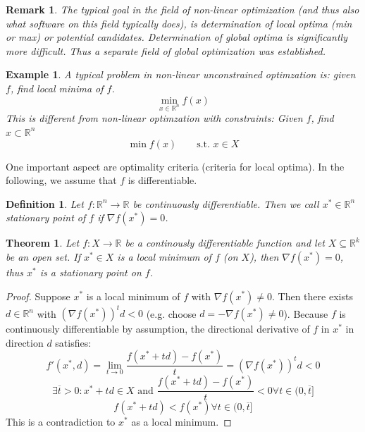 \documentclass[a4paper]{article}
\newcounter{lecref}[subsection]
\numberwithin{lecref}{subsection}
\newtheorem{theorem}[lecref]{Theorem}
\newtheorem*{Example}{Example}
\newtheorem{definition}[lecref]{Definition}
\newtheorem*{Remark}{Remark}
\begin{document}
\begin{Remark}
	The typical goal in the field of non-linear optimization (and thus also what software on this field typically does), is determination of local optima (min or max) or potential candidates. Determination of global optima is significantly more difficult. Thus a separate field of global optimization was established.
\end{Remark}

\begin{Example}
	A typical problem in non-linear unconstrained optimzation is: given $f$, find local minima of $f$.
	\[ \min_{x \in \mathbb R^n} f(x) \]
	This is different from non-linear optimzation \emph{with} constraints:
	Given $f$, find $x \subset \mathbb R^n$
	\[ \min f(x) \qquad \text{s.t. } x \in X \]
\end{Example}

One important aspect are optimality criteria (criteria for local optima).
In the following, we assume that $f$ is differentiable.

\begin{definition}
	Let $f: \mathbb R^n \to \mathbb R$ be continuously differentiable. Then we call $x^* \in \mathbb R^n$ \emph{stationary point} of $f$ if $\nabla f(x^*) = 0$.
\end{definition}

\begin{theorem}
	\label{theorem:2.1.1}
	Let $f: X \to \mathbb R$ be a continously differentiable function and let $X \subseteq \mathbb R^k$ be an open set. If $x^* \in X$ is a local minimum of $f$ (on $X$), then $\nabla f(x^*) = 0$, thus $x^*$ is a stationary point on $f$.
\end{theorem}

\begin{proof}
	Suppose $x^*$ is a local minimum of $f$ with $\nabla f(x^*) \neq 0$.
	Then there exists $d \in \mathbb R^n$ with $(\nabla f(x^*))^t d < 0$ (e.g. choose $d = -\nabla f(x^*) \neq 0$).
	Because $f$ is continuously differentiable by assumption, the directional derivative of $f$ in $x^*$ in direction $d$ satisfies:
	\[ f'(x^*, d) = \lim_{t \to 0} \frac{f(x^* + td) - f(x^*)}{t} = \left(\nabla f(x^*)\right)^t d < 0 \]
	\[ \exists \overline{t} > 0: x^* + td \in X \text{ and } \frac{f(x^* + td) - f(x^*)}{t} < 0 \forall t \in (0, \overline{t}] \]
	\[ f(x^* + td) < f(x^*) \forall t \in (0, \overline t] \]
	This is a contradiction to $x^*$ as a local minimum.
\end{proof}
\end{document}
